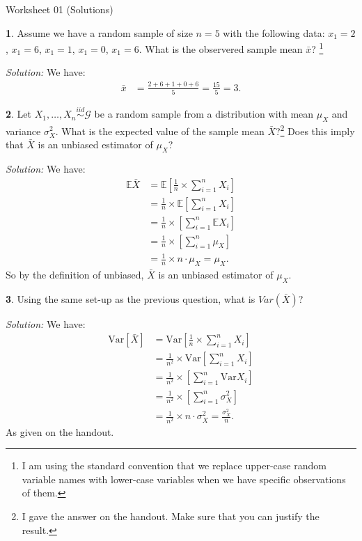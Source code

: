 \documentclass{tufte-handout}
\newcommand{\E}{\mathbb{E}}
\newcommand{\V}{\text{Var}}
\newcommand{\iid}{\stackrel{iid}{\sim}}
\begin{document}
\justify

{\LARGE Worksheet 01 (Solutions)}

\vspace*{18pt}


\textbf{1}. Assume we have a random sample of size $n = 5$ with the following data:
$x_1 = 2$, $x_1 = 6$, $x_1 = 1$, $x_1 = 0$, $x_1 = 6$. What is the observered
sample mean $\bar{x}$? 
\footnote{
  I am using the standard convention that we replace upper-case random 
  variable names with lower-case variables when we have specific 
  observations of them. 
}

\textit{Solution:} We have:
\begin{align*}
\bar{x} &= \frac{2 + 6 + 1 + 0 + 6}{5} = \frac{15}{5} = 3.
\end{align*}

\textbf{2}. Let $X_1, \ldots, X_n \iid \mathcal{G}$ be a random sample from a distribution
with mean $\mu_X$ and variance $\sigma^2_X$. What is the expected value of the
sample mean $\bar{X}$?\footnote{
  I gave the answer on the handout. Make sure that you can justify
  the result.
} Does this imply that $\bar{X}$ is an unbiased estimator of $\mu_X$?

\textit{Solution:} We have:
\begin{align*}
\E \bar{X} &= \E \left[ \frac{1}{n} \times \sum_{i=1}^n X_i \right] \\
&= \frac{1}{n} \times \E \left[ \sum_{i=1}^n X_i \right] \\
&= \frac{1}{n} \times \left[ \sum_{i=1}^n \E X_i \right] \\
&= \frac{1}{n} \times \left[ \sum_{i=1}^n \mu_X \right] \\
&= \frac{1}{n} \times n \cdot \mu_X = \mu_X.
\end{align*}
So by the definition of unbiased, $\bar{X}$ is an unbiased estimator of $\mu_X$.

\textbf{3}. Using the same set-up as the previous question, what is $Var(\bar{X})$?

\textit{Solution:} We have:
\begin{align*}
\V [\bar{X}] &= \V \left[ \frac{1}{n} \times \sum_{i=1}^n X_i \right] \\
&= \frac{1}{n^2} \times \V \left[ \sum_{i=1}^n X_i \right] \\
&= \frac{1}{n^2} \times \left[ \sum_{i=1}^n \V X_i \right] \\
&= \frac{1}{n^2} \times \left[ \sum_{i=1}^n \sigma_X^2 \right] \\
&= \frac{1}{n^2} \times n \cdot \sigma_X^2 = \frac{\sigma_X^2}{n}.
\end{align*}
As given on the handout.
\end{document}
